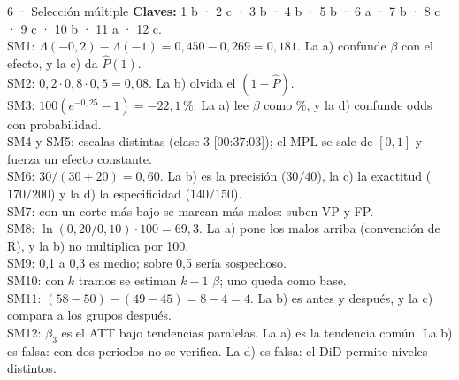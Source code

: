 \documentclass[11pt]{article}
\begin{document}
\begin{pauta}{6 · Selección múltiple}
\textbf{Claves:} 1 b · 2 c · 3 b · 4 b · 5 b · 6 a · 7 b · 8 c · 9 c · 10 b · 11 a · 12 c.\\[2pt]
SM1: $\Lambda(-0{,}2)-\Lambda(-1)=0{,}450-0{,}269=0{,}181$. La a) confunde $\beta$ con el efecto, y la c) da $\hat P(1)$.\\
SM2: $0{,}2\cdot0{,}8\cdot0{,}5=0{,}08$. La b) olvida el $(1-\hat P)$.\\
SM3: $100(e^{-0{,}25}-1)=-22{,}1$\,\%. La a) lee $\beta$ como \%, y la d) confunde odds con probabilidad.\\
SM4 y SM5: escalas distintas (clase 3 [00:37:03]); el MPL se sale de $[0,1]$ y fuerza un efecto constante.\\
SM6: $30/(30+20)=0{,}60$. La b) es la precisión ($30/40$), la c) la exactitud ($170/200$) y la d) la especificidad ($140/150$).\\
SM7: con un corte más bajo se marcan más malos: suben VP y FP.\\
SM8: $\ln(0{,}20/0{,}10)\cdot100=69{,}3$. La a) pone los malos arriba (convención de R), y la b) no multiplica por 100.\\
SM9: 0,1 a 0,3 es medio; sobre 0,5 sería sospechoso.\\
SM10: con $k$ tramos se estiman $k-1$ $\beta$; uno queda como base.\\
SM11: $(58-50)-(49-45)=8-4=4$. La b) es antes y después, y la c) compara a los grupos después.\\
SM12: $\beta_3$ es el ATT bajo tendencias paralelas. La a) es la tendencia común. La b) es falsa: con dos periodos no se verifica. La d) es falsa: el DiD permite niveles distintos.
\end{pauta}
\end{document}
